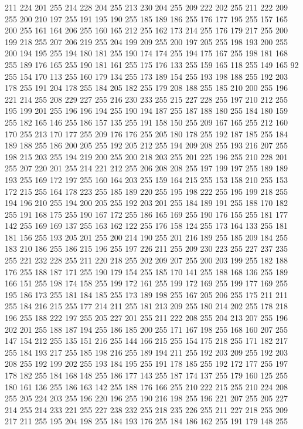 211 224 201 255 214 228 204 255 213 230 204 255 209 222 202 255 211 222 209 255 200 210 197 255 191 195 190 255 185 189 186 255 176 177 195 255 157 165 200 255 161 164 206 255 160 165 212 255 162 173 214 255 176 179 217 255 200 199 218 255 207 206 219 255
204 199 209 255 200 197 205 255 198 193 200 255 200 194 195 255 194 180 181 255 190 174 174 255 194 175 167 255 198 181 168 255 189 176 165 255 190 181 161 255 175 176 133 255 159 165 118 255 149 165 92 255 154 170 113 255 160 179 134 255 173 189 154 255
193 198 188 255 192 203 178 255 191 204 178 255 184 205 182 255 179 208 188 255 185 210 200 255 196 221 214 255 208 229 227 255 216 230 233 255 215 227 228 255 197 210 212 255 195 199 201 255 196 196 194 255 190 194 187 255 187 188 180 255 184 180 159 255
182 165 146 255 186 157 135 255 191 158 150 255 209 167 165 255 212 160 170 255 213 170 177 255 209 176 176 255 205 180 178 255 192 187 185 255 184 189 188 255 186 200 205 255 192 205 212 255 194 209 208 255 193 216 207 255 198 215 203 255 194 219 200 255
200 218 203 255 201 225 196 255 210 228 201 255 207 220 201 255 214 221 212 255 206 208 208 255 197 199 197 255 189 189 193 255 169 172 197 255 160 164 203 255 159 164 215 255 153 158 210 255 153 172 215 255 164 178 223 255 185 189 220 255 195 198 222 255
195 199 218 255 194 196 210 255 194 200 205 255 192 203 201 255 184 189 191 255 188 170 182 255 191 168 175 255 190 167 172 255 186 165 169 255 190 176 155 255 181 177 142 255 169 169 137 255 163 162 122 255 176 158 124 255 173 164 133 255 181 181 156 255
193 205 201 255 200 214 190 255 201 216 189 255 185 209 184 255 183 210 186 255 186 215 196 255 197 226 211 255 209 230 223 255 227 237 235 255 221 232 228 255 211 220 218 255 202 209 207 255 200 203 199 255 182 188 176 255 188 187 171 255 190 179 154 255
185 170 141 255 188 168 136 255 189 166 151 255 198 174 158 255 199 172 161 255 199 172 169 255 199 177 169 255 195 186 173 255 181 184 185 255 173 189 198 255 167 205 206 255 175 211 211 255 184 216 215 255 177 214 211 255 181 213 209 255 180 214 202 255
178 218 196 255 188 222 197 255 205 227 201 255 211 222 208 255 204 213 207 255 196 202 201 255 188 187 194 255 186 185 200 255 171 167 198 255 168 160 207 255 147 154 212 255 135 151 216 255 144 166 215 255 154 175 218 255 171 182 217 255 184 193 217 255
185 198 216 255 189 194 211 255 192 203 209 255 192 203 208 255 192 199 202 255 193 184 195 255 191 178 185 255 192 172 177 255 197 178 182 255 184 168 148 255 186 177 143 255 187 174 137 255 179 160 125 255 180 161 136 255 186 163 142 255 188 176 166 255
210 222 215 255 210 224 208 255 205 224 203 255 196 220 196 255 190 216 198 255 196 221 207 255 205 227 214 255 214 233 221 255 227 238 232 255 218 235 226 255 211 227 218 255 209 217 211 255 195 204 198 255 184 193 176 255 184 186 162 255 191 179 148 255
